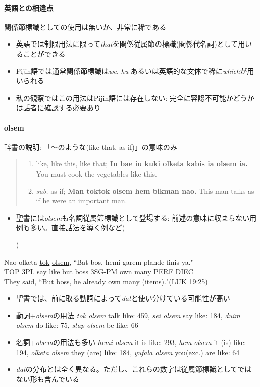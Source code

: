\documentclass[11pt,a4paper]{jsarticle}
\newcounter{tempcnt}
\newcommand{\exn}[1]{%
\setcounter{tempcnt}{\value{exx}}%
\addtocounter{tempcnt}{#1}%
\arabic{tempcnt}}
\begin{document}
\paragraph{英語との相違点} 関係節標識としての使用は無いか、非常に稀である
\begin{itemize}
  \item 英語では制限用法に限って\textit{that}を関係従属節の標識(関係代名詞)として用いることができる\citep[635-638]{english}
  \item Pijin語では通常関係節標識は\textit{we}, \textit{hu} あるいは英語的な文体で稀に\textit{which}が用いられる
  \item 私の観察ではこの用法はPijin語には存在しない: 完全に容認不可能かどうかは話者に確認する必要あり
\end{itemize}
\paragraph{olsem} 辞書\citep[157]{dictionary}の説明: 「～のような(like that, as if)」の意味のみ
\begin{quote}
  \begin{enumerate}
    \item like, like this, like that; \textbf{Iu bae iu kuki olketa kabis ia olsem ia.} You must cook the vegetables like this.
    \item \textit{sub.} as if; \textbf{Man toktok olsem hem bikman nao.} This man talks as if he were an important man.
  \end{enumerate}
\end{quote}
\begin{itemize}
  \item 聖書には\textit{olsem}も名詞従属節標識として登場する: 前述の意味に収まらない用例も多い。直接話法を導く例など(\exn{1})
\end{itemize}
\begin{exe}
  \ex
  \gll Nao olketa \underline{tok} \underline{olsem}, ``Bat bos, hemi garem plande finis ya."\\
  TOP 3PL \underline{say} \underline{like} but boss 3SG-PM own many PERF DIEC\\
  \glt They said, ``But boss, he already own many (items)."(LUK 19:25)
\end{exe}
\begin{itemize}
  \item 聖書では、前に取る動詞によって\textit{dat}と使い分けている可能性が高い
  \item 動詞+\textit{olsem}の用法 \textit{tok olsem} talk like: 459, \textit{sei olsem} say like: 184, \textit{duim olsem} do like: 75, \textit{stap olsem} be like: 66
  \item 名詞+\textit{olsem}の用法も多い \textit{hemi olsem} it is like: 293, \textit{hem olsem} it (is) like: 194, \textit{olketa olsem} they (are) like: 184, \textit{yufala olsem} you(exc.) are like: 64
  \item \textit{dat}の分布とは全く異なる。ただし、これらの数字は従属節標識としてではない形も含んでいる
\end{itemize}
\end{document}
